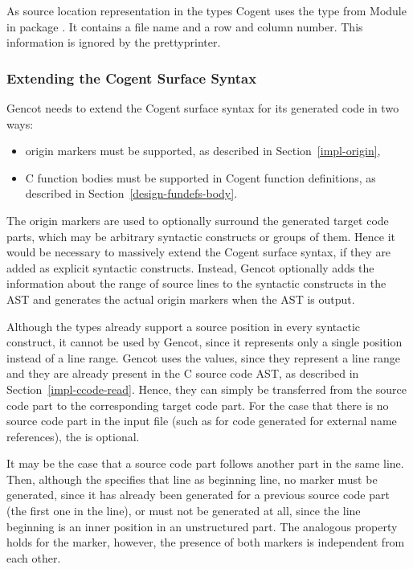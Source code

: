 As source location representation in the  types Cogent uses the type  from Module 
 in package .
It contains a file name and a row and column number. This information is ignored by the prettyprinter.

\subsubsection{Extending the Cogent Surface Syntax}

Gencot needs to extend the Cogent surface syntax for its generated code in two ways:
\begin{itemize}
\item origin markers must be supported, as described in Section~\ref{impl-origin},
\item C function bodies must be supported in Cogent function definitions, as described in Section~\ref{design-fundefs-body}.
\end{itemize}

The origin markers are used to optionally surround the generated target code parts, which may be arbitrary syntactic constructs
or groups of them. Hence it would be necessary to massively extend the Cogent surface syntax, if they are added as explicit 
syntactic constructs. Instead, Gencot optionally adds the information about the range of source lines to the syntactic
constructs in the AST and generates the actual origin markers when the AST is output. 

Although the  types already support a source position in every syntactic construct, it cannot be used by Gencot,
since it represents only a single position instead of a line range. Gencot uses the  values, since they represent
a line range and they are already present in the C source code AST, as described in Section~\ref{impl-ccode-read}. Hence, they
can simply be transferred from the source code part to the corresponding target code part. For the case that there is no
source code part in the input file (such as for code generated for external name references), the  is optional.

It may be the case that a source code part follows another part in the same line. Then, although the  specifies 
that line as beginning line, no  marker must be generated, since it has already been generated for a previous 
source code part (the first one in the line), or must not be generated at all, since the line beginning is an inner position
in an unstructured part. The analogous property holds for the  marker, however, the presence of both markers
is independent from each other.

